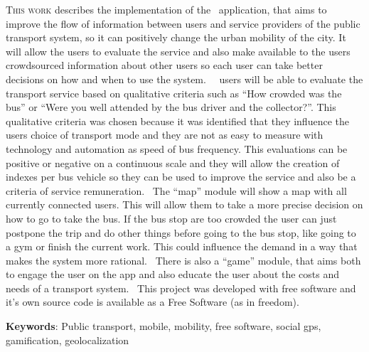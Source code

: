 \lettrine{T}{his work} describes the implementation of the \trilhasp~application, that aims to improve the flow of information between users and service providers of the public transport system, so it can positively change the urban mobility of the city. It will allow the users to evaluate the service and also make available to the users crowdsourced information about other users so each user can take better decisions on how and when to use the system.%
%
~\trilhasp~users will be able to evaluate the transport service based on qualitative criteria such as ``How crowded was the bus'' or ``Were you well attended by the bus driver and the collector?''. This qualitative criteria was chosen because it was identified that they influence the users choice of transport mode and they are not as easy to measure with technology and automation as speed of bus frequency. This evaluations can be positive or negative on a continuous scale and they will allow the creation of indexes per bus vehicle so they can be used to improve the service and also be a criteria of service remuneration.%
%
~The ``map'' module will show a map with all currently connected users. This will allow them to take a more precise decision on how to go to take the bus. If the bus stop are too crowded the user can just postpone the trip and do other things before going to the bus stop, like going to a gym or finish the current work. This could influence the demand in a way that makes the system more rational.%
%
~There is also a ``game'' module, that aims both to engage the user on the app and also educate the user about the costs and needs of a transport system.%
%
~This project was developed with free software and it's own source code is available as a Free Software (as in freedom).

\vspace{\onelineskip}

\vfill

\noindent 

\textbf{Keywords}: Public transport, mobile, mobility, free software, social gps, gamification, geolocalization